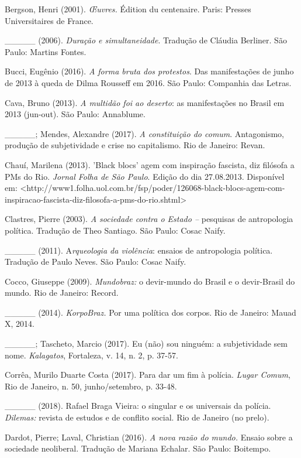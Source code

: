 Bergson, Henri (2001). \emph{Œuvres. }Édition du centenaire. Paris:
Presses Universitaires de France.

\_\_\_\_\_ (2006). \emph{Duração e simultaneidade}. Tradução de Cláudia
Berliner. São Paulo: Martins Fontes.

Bucci, Eugênio (2016). \emph{A forma bruta dos protestos}. Das
manifestações de junho de 2013 à queda de Dilma Rousseff em 2016. São
Paulo: Companhia das Letras.

Cava, Bruno (2013). \emph{A multidão foi ao deserto}: as manifestações
no Brasil em 2013 (jun-out). São Paulo: Annablume.

\_\_\_\_\_; Mendes, Alexandre (2017). \emph{A constituição do comum}.
Antagonismo, produção de subjetividade e crise no capitalismo. Rio de
Janeiro: Revan.

Chauí, Marilena (2013). 'Black blocs' agem com inspiração fascista, diz
filósofa a PMs do Rio. \emph{Jornal Folha de São Paulo}. Edição do dia
27.08.2013. Disponível em:
\textless{}http://www1.folha.uol.com.br/fsp/poder/126068-black-blocs-agem-com-inspiracao-fascista-diz-filosofa-a-pms-do-rio.shtml\textgreater{}

Clastres, Pierre (2003). \emph{A sociedade contra o Estado --} pesquisas
de antropologia política. Tradução de Theo Santiago. São Paulo: Cosac
Naify.

\_\_\_\_\_ (2011). A\emph{rqueologia da violência}: ensaios de
antropologia política. Tradução de Paulo Neves. São Paulo: Cosac Naify.

Cocco, Giuseppe (2009). \emph{Mundobraz: }o devir-mundo do Brasil e o
devir-Brasil do mundo. Rio de Janeiro: Record.

\_\_\_\_\_ (2014). \emph{KorpoBraz.} Por uma política dos corpos. Rio de
Janeiro: Mauad X, 2014.

\_\_\_\_\_; Tascheto, Marcio (2017). Eu (não) sou ninguém: a
subjetividade sem nome. \emph{Kalagatos}, Fortaleza, v. 14, n. 2, p.
37-57.

Corrêa, Murilo Duarte Costa (2017). Para dar um fim à polícia.
\emph{Lugar Comum}, Rio de Janeiro, n. 50, junho/setembro, p. 33-48.

\_\_\_\_\_ (2018). Rafael Braga Vieira: o singular e os universais da
polícia.\emph{ Dilemas: }revista de estudos e de conflito social. Rio de
Janeiro (no prelo).

Dardot, Pierre; Laval, Christian (2016). \emph{A nova razão do mundo.
}Ensaio sobre a sociedade neoliberal. Tradução de Mariana Echalar. São
Paulo: Boitempo.

